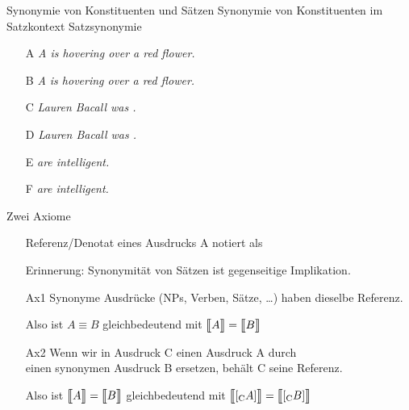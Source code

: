 \begin{frame}
  {Synonymie von Konstituenten und Sätzen}
  Synonymie von Konstituenten im Satzkontext  Satzsynonymie\\
  \onslide<+->
  \Halbzeile
  \begin{itemize}[<+->]
    \item[A] \alert{\textit{A  is hovering over a red flower.}}
    \item[B] \alert{\textit{A  is hovering over a red flower.}}
    \item[ ] 
    \item[ ] 
      \Halbzeile
    \item[C] \alert{\textit{Lauren Bacall was .}}
    \item[D] \alert{\textit{Lauren Bacall was .}}
    \item[ ] 
      \Halbzeile
    \item[E] \alert{\textit{ are intelligent.}}
    \item[F] \alert{\textit{ are intelligent.}}
    \item[ ] 
  \end{itemize}
\end{frame}

\begin{frame}
  {Zwei Axiome}
  \onslide<+->
  \begin{itemize}[<+->]
    \item[ ] Referenz\slash Denotat eines Ausdrucks A notiert als \alert{}\\
      \Zeile
    \item[ ] Erinnerung: Synonymität von Sätzen ist gegenseitige Implikation.
      \Zeile
    \item[Ax1] Synonyme Ausdrücke (NPs, Verben, Sätze, \ldots) haben dieselbe Referenz.
    \item[ ] Also ist \alert{$A\equiv B$} gleichbedeutend mit \alert{$\den{A}=\den{B}$}
      \Zeile
    \item[Ax2] Wenn wir in Ausdruck C einen Ausdruck A durch\\
      einen synonymen Ausdruck B ersetzen, behält C seine Referenz.
    \item[ ] Also ist \alert{$\den{A}=\den{B}$} gleichbedeutend mit \alert{$\den{[\Sub{C} A]}=\den{[\Sub{C} B]}$}
  \end{itemize}
\end{frame}

